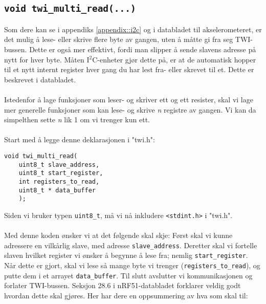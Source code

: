 \documentclass[11pt,a4paper]{article}
\begin{document}
\subsection{\texorpdfstring{\texttt{void twi_multi_read(...)}}{void twi\_multi\_read(...)}}
Som dere kan se i appendiks \ref{appendix::i2c} og i databladet til akselerometeret, er det mulig å lese- eller skrive flere byte av gangen, uten å måtte gi fra seg TWI-bussen. Dette er også mer effektivt, fordi man slipper å sende slavens adresse på nytt for hver byte. Måten I$^2$C-enheter gjør dette på, er at de automatisk hopper til et nytt internt register hver gang du har lest fra- eller skrevet til et. Dette er beskrevet i databladet.\\
\\
Istedenfor å lage funksjoner som leser- og skriver ett og ett resister, skal vi lage mer generelle funksjoner som kan lese- og skrive \textit{n} registre av gangen. Vi kan da simpelthen sette \textit{n} lik 1 om vi trenger kun ett.\\
\\
Start med å legge denne deklarasjonen i "twi.h":
\begin{verbatim}
void twi_multi_read(
	uint8_t slave_address,
	uint8_t start_register,
	int registers_to_read,
	uint8_t * data_buffer
	);
\end{verbatim}
Siden vi bruker typen \texttt{uint8_t}, må vi nå inkludere \texttt{<stdint.h>} i "twi.h".\\
\\
Med denne koden ønsker vi at det følgende skal skje: Først skal vi kunne adressere en vilkårlig slave, med adresse \texttt{slave_address}. Deretter skal vi fortelle slaven hvilket register vi ønsker å begynne å lese fra; nemlig \texttt{start_register}. Når dette er gjort, skal vi lese så mange byte vi trenger (\texttt{registers_to_read}), og putte dem i et arrayet \texttt{data_buffer}. Til slutt avslutter vi kommunikasjonen og forlater TWI-bussen. Seksjon 28.6 i nRF51-databladet forklarer veldig godt hvordan dette skal gjøres.
Her har dere en oppsummering av hva som skal til:
\end{document}
